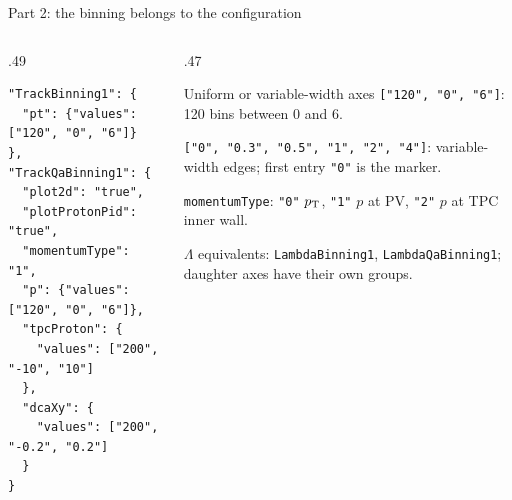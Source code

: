 \begin{frame}[fragile]{Part 2: the binning belongs to the configuration}
 \begin{columns}[T]
 \begin{column}{.49\textwidth}
 \begin{lstlisting}
"TrackBinning1": {
  "pt": {"values": ["120", "0", "6"]}
},
"TrackQaBinning1": {
  "plot2d": "true",
  "plotProtonPid": "true",
  "momentumType": "1",
  "p": {"values": ["120", "0", "6"]},
  "tpcProton": {
    "values": ["200", "-10", "10"]
  },
  "dcaXy": {
    "values": ["200", "-0.2", "0.2"]
  }
}
 \end{lstlisting}
 \end{column}
 \begin{column}{.47\textwidth}
 \small
 \begin{block}{Uniform or variable-width axes}
 \texttt{["120", "0", "6"]}: 120 bins between 0 and 6.\par\medskip
 \texttt{["0", "0.3", "0.5", "1", "2", "4"]}: variable-width edges; first entry \texttt{"0"} is the marker.
 \end{block}
 \texttt{momentumType}: \texttt{"0"} $p_{\rm T}$, \texttt{"1"} $p$ at PV, \texttt{"2"} $p$ at TPC inner wall.\par\medskip
 $\Lambda$ equivalents: \texttt{LambdaBinning1}, \texttt{LambdaQaBinning1}; daughter axes have their own groups.
 \end{column}
 \end{columns}
\end{frame}

